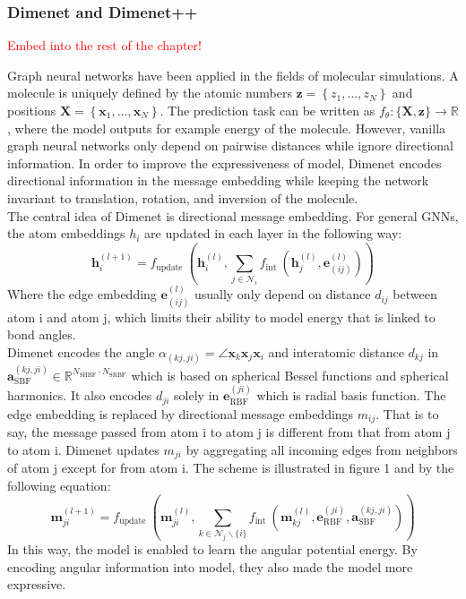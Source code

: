 \subsubsection{Dimenet and Dimenet++}
\label{subsubsec:dimenet}

\textcolor{red}{Embed into the rest of the chapter!}

Graph neural networks have been applied in the fields of molecular simulations. 
A molecule is uniquely defined by the atomic numbers 
$\boldsymbol{z}=\left\{z_{1}, \ldots, z_{N}\right\}$ and positions 
$ \boldsymbol{X}=\left\{\boldsymbol{x}_{1}, \ldots, \boldsymbol{x}_{N}\right\}$. 
The prediction task can be written as 
$f_{\theta}:\{\boldsymbol{X}, \boldsymbol{z}\} \rightarrow \mathbb{R}$, 
where the model outputs for example energy of the molecule. However, vanilla graph 
neural networks only depend on pairwise distances while ignore directional information. 
In order to improve the expressiveness of model, Dimenet\cite*{DBLP:journals/corr/abs-2003-03123} 
encodes directional information in the message embedding while keeping the network invariant to 
translation, rotation, and inversion of the molecule\cite*{DBLP:journals/corr/abs-2003-03123}. \\
The central idea of Dimenet is directional message embedding. For general GNNs, the atom 
embeddings $h_i$ are updated in each layer in the following way:\\
\[
    \boldsymbol{h}_{i}^{(l+1)}=f_{\text {update }}\left(\boldsymbol{h}_{i}^{(l)}, \sum_{j \in \mathcal{N}_{i}} f_{\text {int }}\left(\boldsymbol{h}_{j}^{(l)}, \boldsymbol{e}_{(i j)}^{(l)}\right)\right)
\]
Where the edge embedding $\boldsymbol{e}_{(i j)}^{(l)}$ usually only depend on 
distance $d_{ij}$ between atom i and atom j, which limits their ability to model 
energy that is linked to bond angles.\\
Dimenet encodes the angle 
$\alpha_{(k j, j i)}=\angle \boldsymbol{x}_{k} \boldsymbol{x}_{j} \boldsymbol{x}_{i}$ 
and interatomic distance $d_{kj}$ in 
$\boldsymbol{a}_{\mathrm{SBF}}^{(k j, j i)} \in \mathbb{R}^{N_{\mathrm{SHBF}} \cdot N_{\mathrm{SRBF}}}$ 
which is based on spherical Bessel functions and spherical harmonics. 
It also encodes $d_{ji}$ solely in $\boldsymbol{e}_{\mathrm{RBF}}^{(j i)}$ which is radial 
basis function.  The edge embedding is replaced by directional message embeddings $m_{ij}$. 
That is to say, the message passed from atom i to atom j is different from that from atom j to atom i. 
Dimenet updates $m_{ji}$ by aggregating all incoming edges from neighbors of atom j except for from atom 
i. The scheme is illustrated in figure 1 and by the following equation:
\[
    \boldsymbol{m}_{j i}^{(l+1)}=f_{\text {update }}\left(\boldsymbol{m}_{j i}^{(l)}, \sum_{k \in \mathcal{N}_{j} \backslash\{i\}} f_{\text {int }}\left(\boldsymbol{m}_{k j}^{(l)}, \boldsymbol{e}_{\mathrm{RBF}}^{(j i)}, \boldsymbol{a}_{\mathrm{SBF}}^{(k j, j i)}\right)\right)
\]
In this way, the model is enabled to learn the angular potential energy. By encoding angular information 
into model, they also made the model more expressive.\\

